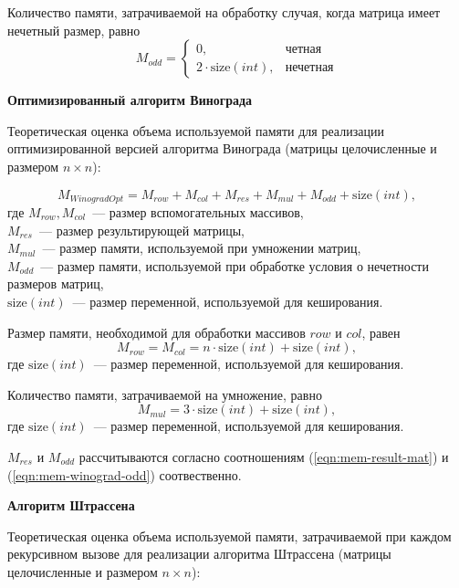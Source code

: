 Количество памяти, затрачиваемой на обработку случая, когда матрица имеет нечетный размер, равно
\begin{equation}
	\label{eqn:mem-winograd-odd}
	M_{odd} = 
	\begin{cases}
		0, & \text{четная}\\
		2 \cdot \text{size}(int), & \text{нечетная}
	\end{cases}
\end{equation}

\textbf{Оптимизированный алгоритм Винограда}

Теоретическая оценка объема используемой памяти для реализации оптимизированной версией алгоритма Винограда (матрицы целочисленные и размером $n \times n$):

\begin{equation}
	M_{WinogradOpt} = M_{row} + M_{col} + M_{res} + M_{mul} + M_{odd} + \text{size}(int),
\end{equation}
где $M_{row}, M_{col}$~--- размер вспомогательных массивов,
\\ $M_{res}$~--- размер результирующей матрицы,
\\ $M_{mul}$~--- размер памяти, используемой при умножении матриц,
\\ $M_{odd}$~--- размер памяти, используемой при обработке условия о нечетности размеров матриц,
\\ $\text{size}(int)$~--- размер переменной, используемой для кеширования.

Размер памяти, необходимой для обработки массивов $row$ и $col$, равен
\begin{equation}
	M_{row} = M_{col} = n \cdot \text{size}(int) + \text{size}(int),
\end{equation}
где $\text{size}(int)$~--- размер переменной, используемой для кеширования.

Количество памяти, затрачиваемой на умножение, равно
\begin{equation}
	M_{mul} = 3 \cdot \text{size}(int) + \text{size}(int),
\end{equation}
где $\text{size}(int)$~--- размер переменной, используемой для кеширования.

$M_{res}$ и $M_{odd}$ рассчитываются согласно соотношениям (\ref{eqn:mem-result-mat}) и (\ref{eqn:mem-winograd-odd}) соотвественно.

\textbf{Алгоритм Штрассена}

Теоретическая оценка объема используемой памяти, затрачиваемой при каждом рекурсивном вызове для реализации алгоритма Штрассена (матрицы целочисленные и размером $n \times n$):

